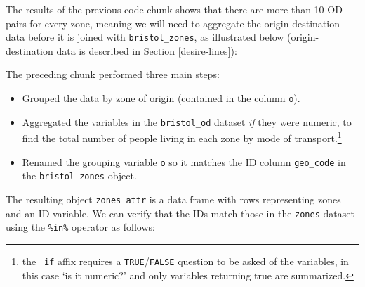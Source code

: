 \documentclass[]{krantz}
\newenvironment{Shaded}{\begin{snugshade}}{\end{snugshade}}
\newcommand{\CommentTok}[1]{\textcolor[rgb]{0.37,0.37,0.37}{\textit{#1}}}
\newcommand{\DataTypeTok}[1]{\textcolor[rgb]{0.27,0.27,0.27}{#1}}
\newcommand{\KeywordTok}[1]{\textcolor[rgb]{0.27,0.27,0.27}{\textbf{#1}}}
\newcommand{\NormalTok}[1]{#1}
\newcommand{\OperatorTok}[1]{\textcolor[rgb]{0.43,0.43,0.43}{\textbf{#1}}}
\newcommand{\StringTok}[1]{\textcolor[rgb]{0.5,0.5,0.5}{#1}}
\providecommand{\tightlist}{%
  \setlength{\itemsep}{0pt}\setlength{\parskip}{0pt}}
\let\rmarkdownfootnote\footnote%
\def\footnote{\protect\rmarkdownfootnote}
\begin{document}
The results of the previous code chunk shows that there are more than 10 OD pairs for every zone, meaning we will need to aggregate the origin-destination data before it is joined with \texttt{bristol\_zones}, as illustrated below (origin-destination data is described in Section \ref{desire-lines}):

\begin{Shaded}
\end{Shaded}

The preceding chunk performed three main steps:

\begin{itemize}
\tightlist
\item
  Grouped the data by zone of origin (contained in the column \texttt{o}).
\item
  Aggregated the variables in the \texttt{bristol\_od} dataset \emph{if} they were numeric, to find the total number of people living in each zone by mode of transport.\footnote{the \texttt{\_if} affix requires a \texttt{TRUE}/\texttt{FALSE} question to be asked of the variables, in this case `is it numeric?' and only variables returning true are summarized.}
\item
  Renamed the grouping variable \texttt{o} so it matches the ID column \texttt{geo\_code} in the \texttt{bristol\_zones} object.
\end{itemize}

The resulting object \texttt{zones\_attr} is a data frame with rows representing zones and an ID variable.
We can verify that the IDs match those in the \texttt{zones} dataset using the \texttt{\%in\%} operator as follows:

\begin{Shaded}
\end{Shaded}
\end{document}
